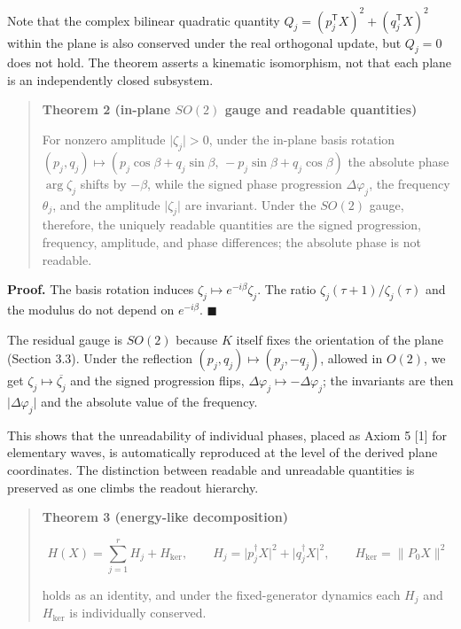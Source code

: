 \documentclass[
  a4paper,
]{article}
\begin{document}
Note that the complex bilinear quadratic quantity
\(Q_j=(p_j^{\mathsf T}X)^2+(q_j^{\mathsf T}X)^2\) within the plane is
also conserved under the real orthogonal update, but \(Q_j=0\) does not
hold. The theorem asserts a kinematic isomorphism, not that each plane
is an independently closed subsystem.

\begin{quote}
\textbf{Theorem 2 (in-plane \(SO(2)\) gauge and readable quantities)}

For nonzero amplitude \(\lvert\zeta_j\rvert>0\), under the in-plane
basis rotation
\((p_j,q_j)\mapsto(p_j\cos\beta+q_j\sin\beta,\,-p_j\sin\beta+q_j\cos\beta)\)
the absolute phase \(\arg\zeta_j\) shifts by \(-\beta\), while the
signed phase progression \(\Delta\varphi_j\), the frequency
\(\theta_j\), and the amplitude \(\lvert\zeta_j\rvert\) are invariant.
Under the \(SO(2)\) gauge, therefore, the uniquely readable quantities
are the signed progression, frequency, amplitude, and phase differences;
the absolute phase is not readable.
\end{quote}

\textbf{Proof.} The basis rotation induces
\(\zeta_j\mapsto e^{-i\beta}\zeta_j\). The ratio
\(\zeta_j(\tau+1)/\zeta_j(\tau)\) and the modulus do not depend on
\(e^{-i\beta}\). \(\blacksquare\)

The residual gauge is \(SO(2)\) because \(K\) itself fixes the
orientation of the plane (Section 3.3). Under the reflection
\((p_j,q_j)\mapsto(p_j,-q_j)\), allowed in \(O(2)\), we get
\(\zeta_j\mapsto\overline{\zeta_j}\) and the signed progression flips,
\(\Delta\varphi_j\mapsto-\Delta\varphi_j\); the invariants are then
\(\lvert\Delta\varphi_j\rvert\) and the absolute value of the frequency.

This shows that the unreadability of individual phases, placed as Axiom
5 {[}1{]} for elementary waves, is automatically reproduced at the level
of the derived plane coordinates. The distinction between readable and
unreadable quantities is preserved as one climbs the readout hierarchy.

\begin{quote}
\textbf{Theorem 3 (energy-like decomposition)}

\[
H(X)=\sum_{j=1}^{r}H_j+H_{\ker},
\qquad
H_j=\lvert p_j^\dagger X\rvert^2+\lvert q_j^\dagger X\rvert^2,
\qquad
H_{\ker}=\lVert P_0X\rVert^2
\]

holds as an identity, and under the fixed-generator dynamics each
\(H_j\) and \(H_{\ker}\) is individually conserved.
\end{quote}
\end{document}

